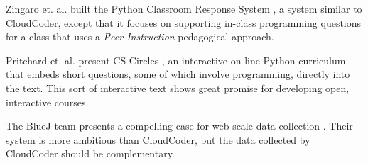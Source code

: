 \documentclass{sig-alternate}
\begin{document}
Zingaro et. al. built the Python Classroom Response System
\cite{Zingaro:2013:FCP:2445196.2445369}, a system similar to
CloudCoder, except that it focuses on supporting in-class programming
questions for a class that uses a {\em Peer Instruction} pedagogical approach.

Pritchard et. al. present CS Circles
\cite{Pritchard:2013:CCI:2445196.2445370}, an interactive on-line
Python curriculum that embeds short questions, some of which involve
programming, directly into the text.  This sort of interactive text
shows great promise for developing open, interactive courses.

The BlueJ team presents a compelling case for web-scale data
collection \cite{Utting:2012:WDG:2361276.2361278}.  Their system is
more ambitious than CloudCoder, but the data collected by CloudCoder
should be complementary.
\end{document}
